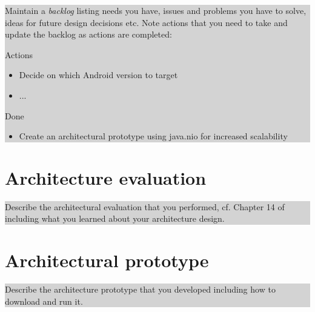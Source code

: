 \documentclass[a4paper,11pt]{report}
\newcommand{\instructions}[1]{
  \noindent\colorbox{lightgray}{%
    \parbox{\linewidth}{%
      #1
    }%
  }%
 \vspace{0.1cm}
}
\begin{document}
\instructions{ Maintain a \emph{backlog} listing needs you have,
  issues and problems you have to solve, ideas for future design
  decisions etc. Note actions that you need to take and update the
  backlog as actions are completed:

\bigskip
Actions

\begin{itemize}
\item Decide on which Android version to target
\item ...
\end{itemize}

Done

\begin{itemize}
\item Create an architectural prototype using java.nio for increased
  scalability

\end{itemize}


}

\chapter{Architecture evaluation}
\label{cha:arch-eval}
\thispagestyle{fancy}

\instructions{
Describe the architectural evaluation that you performed, cf. Chapter
14 of~\citet{rozanski2011software} including what you learned about
your architecture design.
}

\chapter{Architectural prototype}
\label{cha:arch-prot}
\thispagestyle{fancy}
\instructions{
Describe the architecture prototype that you developed
  including how to download and run it.
}





%
%


\end{document}
